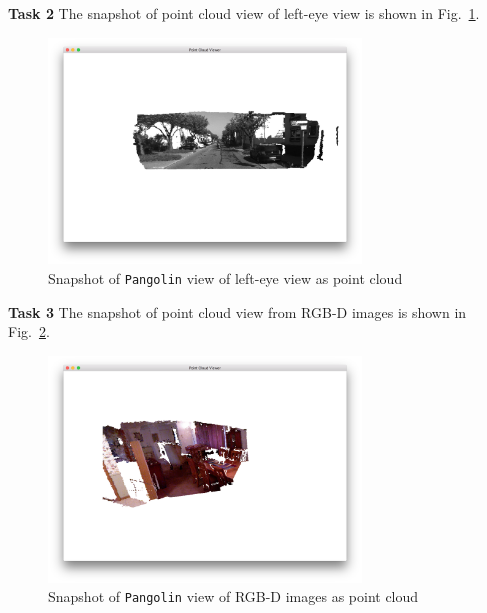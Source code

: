 \documentclass[12pt,a4paper]{article}
\begin{document}
    \textsf{\textbf{Task 2}}
    The snapshot of point cloud view of left-eye view is shown in Fig.~\ref{fig:disparity}.
    \begin{figure}[!h]
        \centering
        \includegraphics[height=6cm]{fig/disparity.png}
        \caption{Snapshot of \texttt{Pangolin} view of left-eye view as point cloud}
        \label{fig:disparity}
    \end{figure}

    \textsf{\textbf{Task 3}}
    The snapshot of point cloud view from RGB-D images is shown in Fig.~\ref{fig:build_map}.
    \begin{figure}[!h]
        \centering
        \includegraphics[height=6cm]{fig/build_map.png}
        \caption{Snapshot of \texttt{Pangolin} view of RGB-D images as point cloud}
        \label{fig:build_map}
    \end{figure}

    
\end{document}

